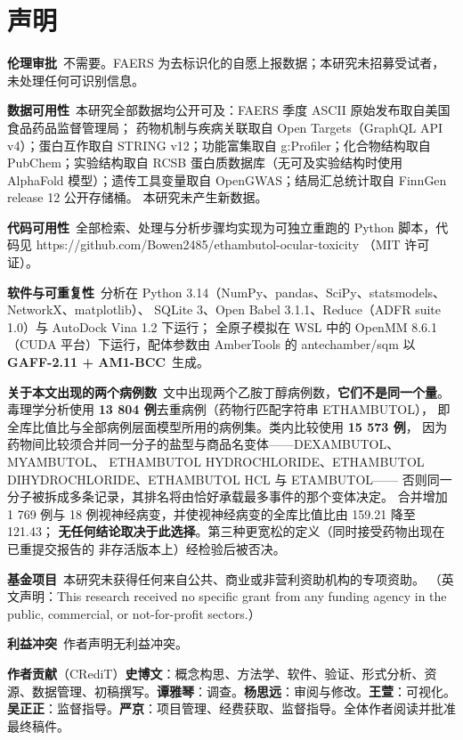 \documentclass[UTF8,fontset=windows,11pt]{ctexart}
\begin{document}
\section{声明}

\textbf{伦理审批}\ 不需要。FAERS 为去标识化的自愿上报数据；本研究未招募受试者，未处理任何可识别信息。

\textbf{数据可用性}\ 本研究全部数据均公开可及：FAERS 季度 ASCII 原始发布取自美国食品药品监督管理局； 药物机制与疾病关联取自 Open Targets（GraphQL API v4）；蛋白互作取自 STRING v12；功能富集取自 g:Profiler；化合物结构取自 PubChem；实验结构取自 RCSB 蛋白质数据库（无可及实验结构时使用 AlphaFold 模型）；遗传工具变量取自 OpenGWAS；结局汇总统计取自 FinnGen release 12 公开存储桶。 本研究未产生新数据。

\textbf{代码可用性}\ 全部检索、处理与分析步骤均实现为可独立重跑的 Python 脚本，代码见 https://github.com/Bowen2485/ethambutol-ocular-toxicity （MIT 许可证）。

\textbf{软件与可重复性}\ 分析在 Python 3.14（NumPy、pandas、SciPy、statsmodels、NetworkX、matplotlib）、 SQLite 3、Open Babel 3.1.1、Reduce（ADFR suite 1.0）与 AutoDock Vina 1.2 下运行； 全原子模拟在 WSL 中的 OpenMM 8.6.1（CUDA 平台）下运行，配体参数由 AmberTools 的 antechamber/sqm 以 \textbf{GAFF-2.11 + AM1-BCC}\ 生成。

\textbf{关于本文出现的两个病例数}\ 文中出现两个乙胺丁醇病例数，\textbf{它们不是同一个量}。 毒理学分析使用 \textbf{13 804 例}去重病例（药物行匹配字符串 ETHAMBUTOL）， 即全库比值比与全部病例层面模型所用的病例集。类内比较使用 \textbf{15 573 例}， 因为药物间比较须合并同一分子的盐型与商品名变体——DEXAMBUTOL、MYAMBUTOL、 ETHAMBUTOL HYDROCHLORIDE、ETHAMBUTOL DIHYDROCHLORIDE、ETHAMBUTOL HCL 与 ETAMBUTOL—— 否则同一分子被拆成多条记录，其排名将由恰好承载最多事件的那个变体决定。 合并增加 1 769 例与 18 例视神经病变，并使视神经病变的全库比值比由 159.21 降至 121.43； \textbf{无任何结论取决于此选择}。第三种更宽松的定义（同时接受药物出现在已重提交报告的 非存活版本上）经检验后被否决。

\textbf{基金项目}\ 本研究未获得任何来自公共、商业或非营利资助机构的专项资助。 （英文声明：This research received no specific grant from any funding agency in the public, commercial, or not-for-profit sectors.）

\textbf{利益冲突}\ 作者声明无利益冲突。

\textbf{作者贡献}（CRediT）\textbf{史博文}：概念构思、方法学、软件、验证、形式分析、资源、数据管理、初稿撰写。\textbf{谭雅琴}：调查。\textbf{杨思远}：审阅与修改。\textbf{王萱}：可视化。\textbf{吴正正}：监督指导。\textbf{严京}：项目管理、经费获取、监督指导。全体作者阅读并批准最终稿件。
\end{document}
